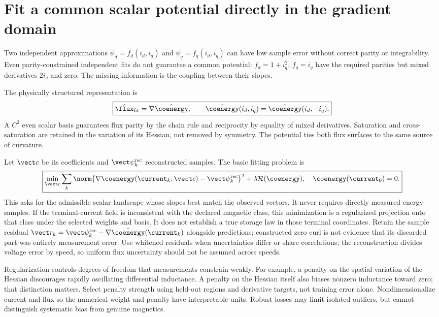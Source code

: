 \section{Fit a common scalar potential directly in the gradient domain}
Two independent approximations $\psi_d=f_d(i_d,i_q)$ and
$\psi_q=f_q(i_d,i_q)$ can have low sample error without correct parity or
integrability. Even parity-constrained independent fits do not guarantee a
common potential: $f_d=1+i_q^2$, $f_q=i_q$ have the required parities but
mixed derivatives $2i_q$ and zero. The missing information is the coupling
between their slopes.

The physically structured representation is
\begin{equation}
 \boxed{\hat\flux_{\rm fit}=\nabla\hat\coenergy,\qquad
 \hat\coenergy(i_d,i_q)=\hat\coenergy(i_d,-i_q).}\label{eq:fit-potential}
\end{equation}
A $C^2$ even scalar basis guarantees flux parity by the chain rule and
reciprocity by equality of mixed derivatives. Saturation and cross-saturation
are retained in the variation of its Hessian, not removed by symmetry.
The potential ties both flux surfaces to the same source of curvature.

Let $\vect c$ be its coefficients and $\vect\psi_k^{\rm rec}$ reconstructed
samples. The basic fitting problem is
\begin{equation}
 \boxed{\min_{\vect c}\sum_k
 \norm{\nabla\coenergy(\current_k;\vect c)-\vect\psi_k^{\rm rec}}^2
       +\lambda\mathcal R(\coenergy),\quad \coenergy(\current_0)=0.}
 \label{eq:gradient-fit}
\end{equation}
This asks for the admissible scalar landscape whose slopes best match the
observed vectors. It never requires directly measured energy samples.
If the terminal-current field is inconsistent with the declared magnetic
class, this minimization is a regularized projection onto that class under
the selected weights and basis. It does not establish a true storage law
in those terminal coordinates. Retain the sample residual
$\vect r_k=\vect\psi_k^{\rm rec}-\nabla\hat\coenergy(\current_k)$ alongside
predictions; constructed zero curl is not evidence that its discarded part
was entirely measurement error. Use
whitened residuals when uncertainties differ or share correlations; the
reconstruction divides voltage error by speed, so uniform flux uncertainty
should not be assumed across speeds.

Regularization controls degrees of freedom that measurements constrain weakly.
For example, a penalty on the spatial variation of the Hessian discourages
rapidly oscillating differential inductance. A penalty on the Hessian itself
also biases nonzero inductance toward zero; that distinction matters. Select
penalty strength using held-out regions and derivative targets, not training
error alone. Nondimensionalize current and flux so the numerical weight and
penalty have interpretable units. Robust losses may limit isolated outliers,
but cannot distinguish systematic bias from genuine magnetics.

